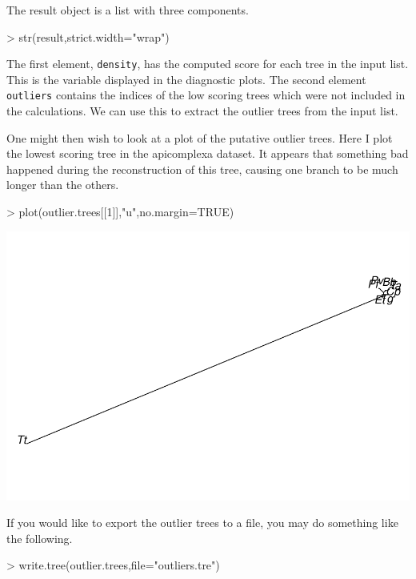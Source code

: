 \documentclass{article}
\begin{document}
The result object is a list with three components.
\begin{Schunk}
\begin{Sinput}
> str(result,strict.width="wrap")
\end{Sinput}
\end{Schunk}
The first element, {\tt density}, has the computed score for each tree
in the input list. This is the variable displayed in the diagnostic
plots. The second element {\tt outliers} contains the
indices of the low scoring trees which were not included in the
calculations. We can use this to extract the outlier trees from the
input list.
\begin{Schunk}
\end{Schunk}
One might then wish to look at a plot of the putative outlier
trees. Here I plot the lowest scoring tree in the apicomplexa
dataset. It appears that something bad happened during the
reconstruction of this tree, causing one branch to be much longer
than the others.
\begin{center}
\begin{Schunk}
\begin{Sinput}
> plot(outlier.trees[[1]],"u",no.margin=TRUE)
\end{Sinput}
\end{Schunk}
\includegraphics{kdetrees-011}
\end{center}
If you would like to export the outlier trees to a file, you may do
something like the following.
\begin{Schunk}
\begin{Sinput}
> write.tree(outlier.trees,file="outliers.tre")
\end{Sinput}
\end{Schunk}
\end{document}
